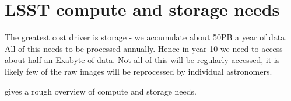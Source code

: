 \section{LSST compute and storage needs}

The greatest cost driver is storage - we accumulate about 50PB a year of data. All of this needs to be processed annually. Hence in year 10 we need to access about half an Exabyte of data. Not all of this will be regularly accessed, it is likely few of the raw images will be reprocessed by individual astronomers.

 gives a rough overview of compute and storage needs.



